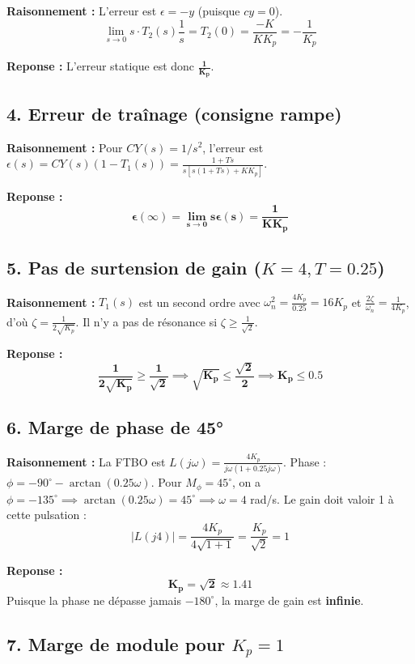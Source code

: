 \documentclass[11pt,a4paper]{article}
\begin{document}
\textbf{Raisonnement :} L'erreur est $\epsilon = -y$ (puisque $cy=0$).
$$ 
\lim_{s \to 0} s \cdot T_2(s) \frac{1}{s} = T_2(0) = \frac{-K}{K K_p} = -\frac{1}{K_p} 
$$

\textbf{Reponse :} L'erreur statique est donc $\mathbf{\frac{1}{K_p}}$.

\subsection*{4. Erreur de traînage (consigne rampe)}

\textbf{Raisonnement :} Pour $CY(s) = 1/s^2$, l'erreur est $\epsilon(s) = CY(s)(1 - T_1(s)) = \frac{1+Ts}{s[s(1+Ts)+K K_p]}$.

\textbf{Reponse :} 
$$ 
\mathbf{\epsilon(\infty) = \lim_{s \to 0} s \epsilon(s) = \frac{1}{K K_p}} 
$$

\subsection*{5. Pas de surtension de gain ($K=4, T=0.25$)}

\textbf{Raisonnement :} $T_1(s)$ est un second ordre avec $\omega_n^2 = \frac{4K_p}{0.25} = 16K_p$ et $\frac{2\zeta}{\omega_n} = \frac{1}{4K_p}$, d'où $\zeta = \frac{1}{2\sqrt{K_p}}$. Il n'y a pas de résonance si $\zeta \ge \frac{1}{\sqrt{2}}$.

\textbf{Reponse :} 
$$ 
\mathbf{\frac{1}{2\sqrt{K_p}} \ge \frac{1}{\sqrt{2}} \implies \sqrt{K_p} \le \frac{\sqrt{2}}{2} \implies K_p \le 0.5} 
$$

\subsection*{6. Marge de phase de 45°}

\textbf{Raisonnement :} La FTBO est $L(j\omega) = \frac{4K_p}{j\omega(1+0.25j\omega)}$. Phase : $\phi = -90^\circ - \arctan(0.25\omega)$.
Pour $M_\phi = 45^\circ$, on a $\phi = -135^\circ \implies \arctan(0.25\omega) = 45^\circ \implies \omega = 4$ rad/s.
Le gain doit valoir 1 à cette pulsation :
$$ 
|L(j4)| = \frac{4K_p}{4\sqrt{1+1}} = \frac{K_p}{\sqrt{2}} = 1 
$$

\textbf{Reponse :} 
$$ 
\mathbf{K_p = \sqrt{2} \approx 1.41} 
$$
Puisque la phase ne dépasse jamais $-180^\circ$, la marge de gain est \textbf{infinie}.

\subsection*{7. Marge de module pour $K_p=1$}
\end{document}
